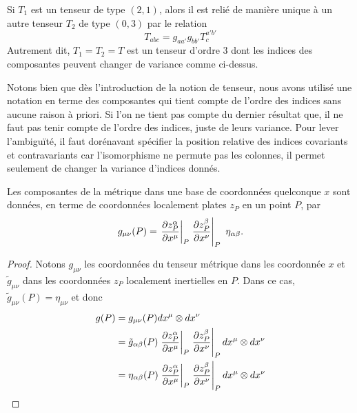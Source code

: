 \documentclass[a4paper,11pt]{report}
\begin{document}
                \begin{exmp}
                    Si $T_1$ est un tenseur de type $(2,1)$, alors il est relié de manière unique à un autre tenseur $T_2$ de type $(0,3)$ par le relation
                    \begin{equation}
                        T_{abc} = g_{aa'}g_{bb'}T^{a'b'}_c
                    \end{equation}
                    Autrement dit, $T_1 = T_2 = T$ est un tenseur d'ordre $3$ dont les indices des composantes peuvent changer de variance comme ci-dessus.
                \end{exmp}
                
                Notons bien que dès l'introduction de la notion de tenseur, nous avons utilisé une notation en terme des composantes qui tient compte de l'ordre des indices sans aucune raison à priori. Si l'on ne tient pas compte du dernier résultat que, il ne faut pas tenir compte de l'ordre des indices, juste de leurs variance. Pour lever l'ambiguïté, il faut dorénavant spécifier la position relative des indices covariants et contravariants car l'isomorphisme ne permute pas les colonnes, il permet seulement de changer la variance d'indices donnés.
                
                \begin{prop}
                \begin{leftbar}
                    Les composantes de la métrique dans une base de coordonnées quelconque $x$ sont données, en terme de coordonnées localement plates $z_P$ en un point $P$, par 
                    \begin{equation}
                        g_{\mu\nu}(P) = \eval{\pdv{z^\alpha_P}{x^\mu}}_{P}\eval{\pdv{z^\beta_P}{x^\nu}}_{P}~\eta_{\alpha\beta}.
                    \end{equation}
                \end{leftbar}
                \end{prop}
                
                \begin{proof}
                    Notons $g_{\mu\nu}$ les coordonnées du tenseur métrique dans les coordonnée $x$ et $\tilde{g}_{\mu\nu}$ dans les coordonnées $z_P$ localement inertielles en $P$. Dans ce cas, $\tilde{g}_{\mu\nu}(P) = \eta_{\mu\nu}$ et donc
                    \begin{align}
                        g(P) &= g_{\mu\nu}(P)dx^\mu\otimes dx^\nu \\
                        &= \tilde{g}_{\alpha\beta}(P) \eval{\pdv{z^\alpha_P}{x^\mu}}_{P}\eval{\pdv{z^\beta_P}{x^\nu}}_{P} dx^\mu\otimes dx^\nu\\
                        &= \eta_{\alpha\beta}(P) \eval{\pdv{z^\alpha_P}{x^\mu}}_{P}\eval{\pdv{z^\beta_P}{x^\nu}}_{P} dx^\mu\otimes dx^\nu
                    \end{align}
                \end{proof}
        
\end{document}
